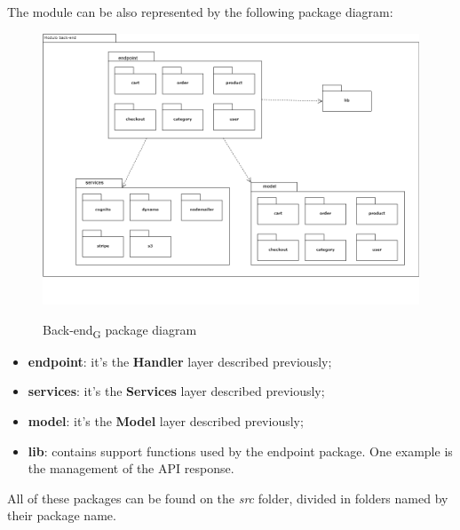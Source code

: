 The module can be also represented by the following package diagram:

\begin{figure}[H]
\centering
\includegraphics[scale=0.45]{res/Architettura/Backend/img/package-back-end}\\
\caption{Back-end\textsubscript{G} package diagram}
\end{figure}

\begin{itemize}
\item \textbf{endpoint}: it's the \textbf{Handler} layer described previously;
\item \textbf{services}: it's the \textbf{Services} layer described previously;
\item \textbf{model}: it's the \textbf{Model} layer described previously;
\item \textbf{lib}: contains support functions used by the endpoint package. One example is the management of the API response.
\end{itemize}

All of these packages can be found on the \textit{src} folder, divided in folders named by their package name.







